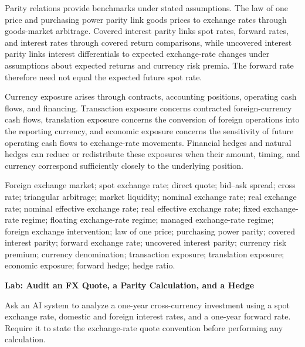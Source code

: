 Parity relations provide benchmarks under stated assumptions. The law of one price and purchasing power parity link goods prices to exchange rates through goods-market arbitrage. Covered interest parity links spot rates, forward rates, and interest rates through covered return comparisons, while uncovered interest parity links interest differentials to expected exchange-rate changes under assumptions about expected returns and currency risk premia. The forward rate therefore need not equal the expected future spot rate.

Currency exposure arises through contracts, accounting positions, operating cash flows, and financing. Transaction exposure concerns contracted foreign-currency cash flows, translation exposure concerns the conversion of foreign operations into the reporting currency, and economic exposure concerns the sensitivity of future operating cash flows to exchange-rate movements. Financial hedges and natural hedges can reduce or redistribute these exposures when their amount, timing, and currency correspond sufficiently closely to the underlying position.




Foreign exchange market; spot exchange rate; direct quote;  bid--ask spread; cross rate; triangular arbitrage; market liquidity; nominal exchange rate; real exchange rate; nominal effective exchange rate; real effective exchange rate; fixed exchange-rate regime; floating exchange-rate regime; managed exchange-rate regime; foreign exchange intervention; law of one price; purchasing power parity; covered interest parity; forward exchange rate; uncovered interest parity; currency risk premium; currency denomination; transaction exposure; translation exposure; economic exposure; forward hedge; hedge ratio.



\textbf{Lab: Audit an FX Quote, a Parity Calculation, and a Hedge}

Ask an AI system to analyze a one-year cross-currency investment using a spot exchange rate, domestic and foreign interest rates, and a one-year forward rate. Require it to state the exchange-rate quote convention before performing any calculation.

